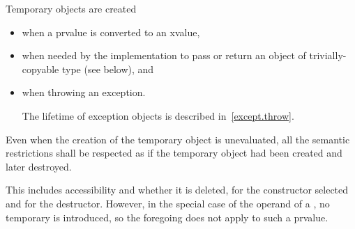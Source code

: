 \pnum
{}%
%
%
%
%
Temporary objects are created
\begin{itemize}
\item
when a prvalue is converted to an xvalue,
\item
when needed by the implementation to pass or return an object of trivially-copyable type (see below),
and
\item
when throwing an exception.
\begin{note}
The lifetime of exception objects is described in~\ref{except.throw}.
\end{note}
\end{itemize}
Even when the creation of the temporary object is
unevaluated,
all the semantic restrictions shall be respected as if the temporary object
had been created and later destroyed.
\begin{note}
This includes accessibility and whether it is deleted,
for the constructor selected and for the destructor. However, in the special
case of the operand of a
, no temporary is introduced,
so the foregoing does not apply to such a prvalue.
\end{note}

